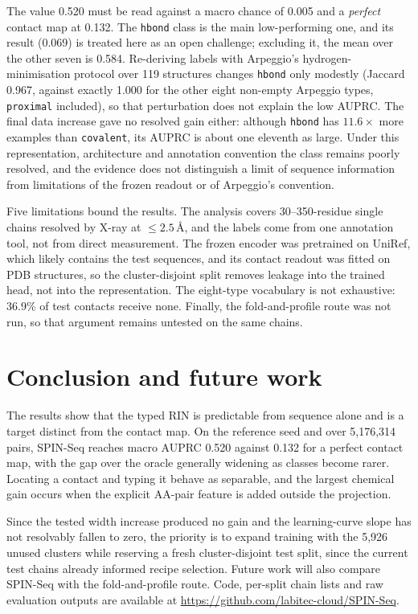 \documentclass[12pt]{article}
\begin{document}
The value 0.520 must be read against a macro chance of 0.005 and a \emph{perfect}
contact map at 0.132. The \texttt{hbond} class is the main low-performing one, and its
result (0.069) is treated here as an open challenge; excluding it, the mean over the
other seven is 0.584. Re-deriving labels with Arpeggio's hydrogen-minimisation protocol
over 119 structures changes \texttt{hbond} only modestly (Jaccard 0.967, against exactly
1.000 for the other eight non-empty Arpeggio types, \texttt{proximal} included), so that
perturbation does not explain the low AUPRC. The final data increase gave no resolved
gain either: although \texttt{hbond} has $11.6\times$ more examples than
\texttt{covalent}, its AUPRC is about one eleventh as large. Under this representation,
architecture and annotation convention the class remains poorly resolved, and the
evidence does not distinguish a limit of sequence information from limitations of the
frozen readout or of Arpeggio's convention.

Five limitations bound the results. The analysis covers 30--350-residue single chains
resolved by X-ray at $\leq 2.5$\,\AA, and the labels come from one annotation tool, not
from direct measurement. The frozen encoder was pretrained on UniRef, which likely
contains the test sequences, and its contact readout was fitted on PDB structures, so
the cluster-disjoint split removes leakage into the trained head, not into the
representation. The eight-type vocabulary is not exhaustive: 36.9\% of test contacts
receive none. Finally, the fold-and-profile route was not run, so that argument remains
untested on the same chains.

\section{Conclusion and future work}
\label{sec:conclusion}

The results show that the typed RIN is predictable from sequence alone and is a target
distinct from the contact map. On the reference seed and over 5,176,314 pairs, SPIN-Seq
reaches macro AUPRC 0.520 against 0.132 for a perfect contact map, with the gap over the
oracle generally widening as classes become rarer. Locating a contact and typing it behave as separable, and the largest chemical
gain occurs when the explicit AA-pair feature is added outside the projection.

Since the tested width increase produced no gain and the learning-curve slope has not resolvably fallen
to zero, the priority is to expand training with the 5,926 unused clusters while reserving a
fresh cluster-disjoint test split, since the current test chains already informed recipe
selection. Future work will also compare SPIN-Seq with the fold-and-profile route. Code, per-split chain
lists and raw evaluation outputs are available at
\url{https://github.com/labitec-cloud/SPIN-Seq}.

{\footnotesize

}
\end{document}
